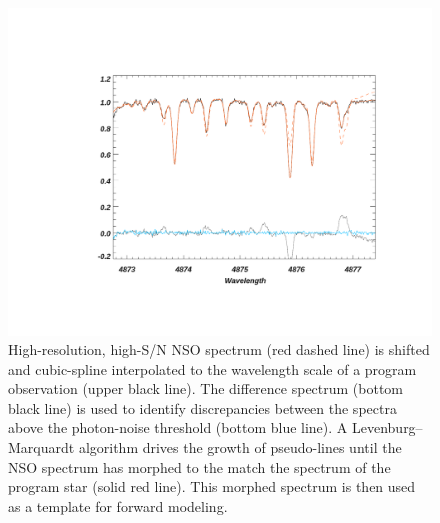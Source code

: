 \begin{figure}
    \centering
    \includegraphics[trim=5cm 3cm 3cm 4cm, clip, width=\textwidth]{figures-4/morph_fit.pdf}
    \caption[NSO template for forward modeling]{High-resolution, high-S/N NSO spectrum (red dashed line) is shifted and cubic-spline interpolated to the wavelength scale of a program observation (upper black line). The difference spectrum (bottom black line) is used to identify discrepancies between the spectra above the photon-noise threshold (bottom blue line). A Levenburg--Marquardt algorithm drives the growth of pseudo-lines until the NSO spectrum has morphed to the match the spectrum of the program star (solid red line). This morphed spectrum is then used as a template for forward modeling.}
    \label{fig:morph}
\end{figure}

